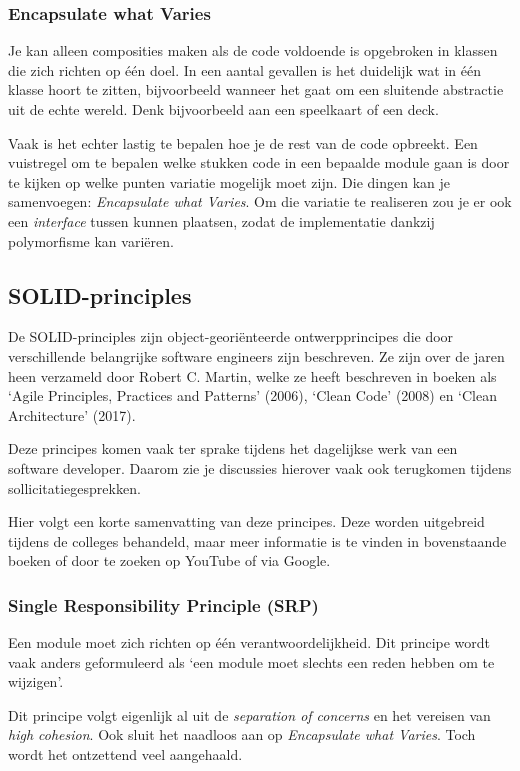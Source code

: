 \documentclass[dutch,a4paper,12pt,doubleside]{book}
\begin{document}
\subsubsection{Encapsulate what Varies}
Je kan alleen composities maken als de code voldoende is opgebroken
in klassen die zich richten op één doel. In een aantal gevallen 
is het duidelijk wat in één klasse hoort te zitten, bijvoorbeeld
wanneer het gaat om een sluitende abstractie uit de echte wereld.
Denk bijvoorbeeld aan een speelkaart of een deck.

Vaak is het echter lastig te bepalen hoe je de rest van de code opbreekt. 
Een vuistregel om te bepalen welke stukken code in een bepaalde module gaan 
is door te kijken op welke punten variatie mogelijk moet zijn. Die dingen 
kan je samenvoegen: \textit{Encapsulate what Varies}. Om die variatie 
te realiseren zou je er ook een \textit{interface} tussen kunnen plaatsen,
zodat de implementatie dankzij polymorfisme kan variëren.

\subsection{SOLID-principles}
De SOLID-principles zijn object-georiënteerde ontwerpprincipes die door 
verschillende belangrijke software engineers zijn beschreven.
Ze zijn over de jaren heen verzameld door Robert C. Martin, 
welke ze heeft beschreven in boeken als 
`Agile Principles, Practices and Patterns' (2006), 
`Clean Code' (2008) en `Clean Architecture' (2017).

Deze principes komen vaak ter sprake tijdens het 
dagelijkse werk van een software developer. Daarom zie 
je discussies hierover vaak ook terugkomen tijdens 
sollicitatiegesprekken.

Hier volgt een korte samenvatting van deze principes.
Deze worden uitgebreid tijdens de colleges behandeld,
maar meer informatie is te vinden in bovenstaande boeken 
of door te zoeken op YouTube of via Google.

\subsubsection{Single Responsibility Principle (SRP)}
Een module moet zich richten op één verantwoordelijkheid.
Dit principe wordt vaak anders geformuleerd als 
`een module moet slechts een reden hebben om te wijzigen'.

Dit principe volgt eigenlijk al uit de \textit{separation of concerns}
en het vereisen van \textit{high cohesion}. Ook sluit het naadloos aan 
op \textit{Encapsulate what Varies}. Toch wordt het ontzettend
veel aangehaald.
\end{document}

